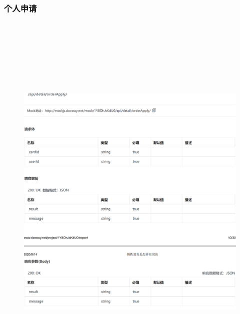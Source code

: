             \subsubsection{个人申请}  
            \begin{figure}[h]
                \centering
                \includegraphics[height=19.0cm,width=14.0cm]{design/image/api10.png} 
                \end{figure}  
                \newpage  
                
